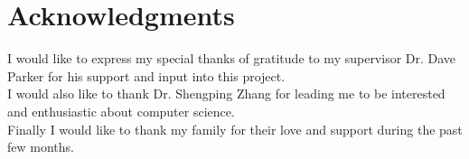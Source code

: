 \section*{Acknowledgments}
I would like to express my special thanks of gratitude to my supervisor Dr. Dave Parker for his support and input into this project. \\

\noindent I would also like to thank Dr. Shengping Zhang for leading me to be interested and enthusiastic about computer science. \\

\noindent Finally I would like to thank my family for their love and support during the past few months.
\newpage